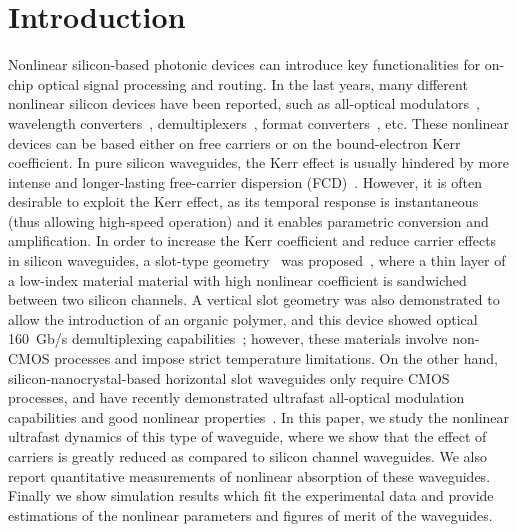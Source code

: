 \documentclass[10pt,letterpaper]{article}
\begin{document}
\section{Introduction}
Nonlinear silicon-based photonic devices can introduce key functionalities for on-chip optical signal processing and routing. In the last years, many different nonlinear silicon devices have been reported, such as all-optical modulators~\cite{Almeida2004b}, wavelength converters~\cite{Lee2009,Driscoll2010}, demultiplexers~\cite{Koos2009}, format converters~\cite{Astar2010}, etc. These nonlinear devices can be based either on free carriers or on the bound-electron Kerr coefficient. In pure silicon waveguides, the Kerr effect is usually hindered by more intense and longer-lasting free-carrier dispersion (FCD)~\cite{Foster2008,Osgood2009}. However, it is often desirable to exploit the Kerr effect, as its temporal response is instantaneous (thus allowing high-speed operation) and it enables parametric conversion and amplification. In order to increase the Kerr coefficient and reduce carrier effects in silicon waveguides, a slot-type geometry~\cite{Almeida2004} was proposed~\cite{Sanchis2007,Koos2007a,Zhang2010,
Rukhlenko2012}, where a thin layer of a low-index material material with high nonlinear coefficient is sandwiched between two silicon channels. A vertical slot geometry was also demonstrated to allow the introduction of an organic polymer, and this device showed optical 160~Gb/s demultiplexing capabilities~\cite{Koos2009}; however, these materials involve non-CMOS processes and impose strict temperature limitations. On the other hand, silicon-nanocrystal-based horizontal slot waveguides only require CMOS processes, and have recently demonstrated ultrafast all-optical modulation capabilities and good nonlinear properties~\cite{Spano2009, Martinez2010a, Oton2010, Trita2011}. In this paper, we study the nonlinear ultrafast dynamics of this type of waveguide, where we show that the effect of carriers is greatly reduced as compared to silicon channel waveguides. We also report quantitative measurements of nonlinear absorption of these waveguides. Finally we show simulation results which fit the experimental data 
and provide estimations of the nonlinear parameters and figures of merit of the waveguides.
\end{document}
